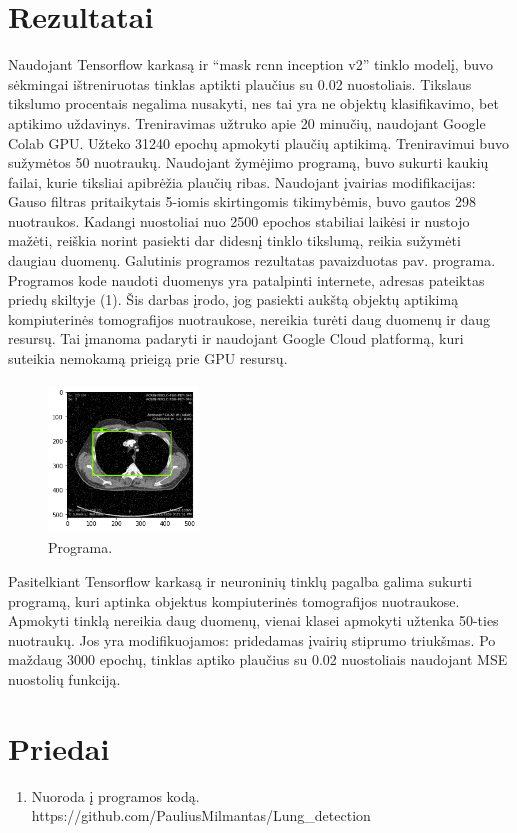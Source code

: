 \documentclass{VUMIFInfKursinis}
\begin{document}
\section{Rezultatai}
\par
Naudojant Tensorflow karkasą ir \enquote{mask rcnn inception v2} tinklo modelį, buvo sėkmingai
ištreniruotas tinklas aptikti plaučius su 0.02 nuostoliais.
Tikslaus tikslumo procentais negalima nusakyti, nes tai yra ne objektų klasifikavimo,
bet aptikimo uždavinys.
Treniravimas užtruko apie 20 minučių,
naudojant Google Colab GPU. Užteko 31240 epochų apmokyti plaučių aptikimą.
Treniravimui buvo sužymėtos 50 nuotraukų. Naudojant žymėjimo programą, buvo sukurti kaukių
failai, kurie tiksliai apibrėžia plaučių ribas. Naudojant įvairias modifikacijas:
Gauso filtras pritaikytais 5-iomis skirtingomis tikimybėmis, buvo gautos 298 nuotraukos.
Kadangi nuostoliai nuo 2500 epochos stabiliai laikėsi ir nustojo mažėti, reiškia norint
pasiekti dar didesnį tinklo tikslumą, reikia sužymėti daugiau duomenų.
Galutinis programos rezultatas pavaizduotas pav. programa. Programos kode naudoti
duomenys yra patalpinti internete, adresas pateiktas priedų skiltyje (1).
Šis darbas įrodo, jog pasiekti aukštą
objektų aptikimą kompiuterinės tomografijos nuotraukose, nereikia turėti daug duomenų ir daug
resursų. Tai įmanoma padaryti ir naudojant Google Cloud platformą, kuri suteikia
nemokamą prieigą prie GPU resursų.


\begin{figure}[ht]
  \centering
  \includegraphics[width=4cm,height=4cm,keepaspectratio]{result1.png}
  \caption{Programa.}
  \label{fig:kaukė1}
\end{figure}

\par
Pasitelkiant Tensorflow karkasą ir neuroninių tinklų pagalba galima sukurti programą,
kuri aptinka objektus kompiuterinės tomografijos nuotraukose. Apmokyti tinklą
nereikia daug duomenų, vienai klasei apmokyti užtenka 50-ties nuotraukų.
Jos yra modifikuojamos: pridedamas įvairių stiprumo triukšmas. Po maždaug 3000 epochų,
tinklas aptiko plaučius su 0.02 nuostoliais naudojant MSE nuostolių funkciją.


\printbibliography[heading=bibintoc]

\section*{Priedai}
\begin{enumerate}
\item Nuoroda į programos kodą. https://github.com/PauliusMilmantas/Lung\_detection 
\end{enumerate}
\end{document}
